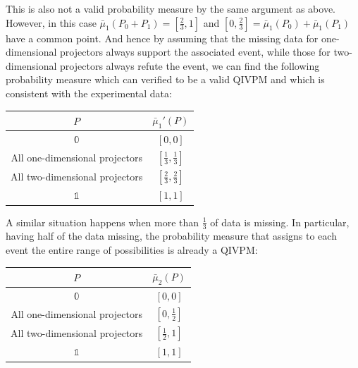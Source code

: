 \documentclass[english,reprint, aps, prl,superscriptaddress, showpacs,
showkeys, longbibliography, amsmath, amssymb, floatfix]{revtex4-1}
\theoremstyle{plain}
\theoremstyle{definition}
\newcommand{\imposs}{\ensuremath{\left[0,0\right]}}
\newcommand{\necess}{\ensuremath{\left[1,1\right]}}
\begin{document}
\noindent This is also not a valid probability measure by the same
argument as above. However, in this case $\bar{\mu}_{1}\left(P_{0}+P_{1}\right)=\left[\tfrac{2}{3},1\right]$
and $\left[0,\tfrac{2}{3}\right]=\bar{\mu}_{1}\left(P_{0}\right)+\bar{\mu}_{1}\left(P_{1}\right)$
have a common point. And hence by assuming that the missing data for
one-dimensional projectors always support the associated event, while
those for two-dimensional projectors always refute the event, we can
find the following probability measure which can verified to be a
valid QIVPM and which is consistent with the experimental data: 
\begin{center}
\begin{tabular}{cc}
\toprule 
\addlinespace
$P$  & $\bar{\mu}_{1}'\left(P\right)$\tabularnewline
\midrule
\midrule 
\addlinespace
$\mathbb{0}$  & $\imposs$\tabularnewline
\midrule 
\addlinespace
All one-dimensional projectors  & $\left[\tfrac{1}{3},\tfrac{1}{3}\right]$\tabularnewline
\midrule 
\addlinespace
All two-dimensional projectors  & $\left[\tfrac{2}{3},\tfrac{2}{3}\right]$\tabularnewline
\midrule 
\addlinespace
$\mathbb{1}$  & $\necess$\tabularnewline
\bottomrule
\end{tabular}
\par\end{center}

A similar situation happens when more than $\frac{1}{3}$ of data
is missing. In particular, having half of the data missing, the probability
measure that assigns to each event the entire range of possibilities
is already a QIVPM:
\begin{center}
\begin{tabular}{cc}
\toprule 
\addlinespace
$P$  & $\bar{\mu}_{2}\left(P\right)$\tabularnewline
\midrule
\midrule 
\addlinespace
$\mathbb{0}$  & $\imposs$\tabularnewline
\midrule 
\addlinespace
All one-dimensional projectors  & $\left[0,\tfrac{1}{2}\right]$\tabularnewline
\midrule 
\addlinespace
All two-dimensional projectors  & $\left[\tfrac{1}{2},1\right]$\tabularnewline
\midrule 
\addlinespace
$\mathbb{1}$  & $\necess$\tabularnewline
\bottomrule
\end{tabular}
\par\end{center}
\end{document}
